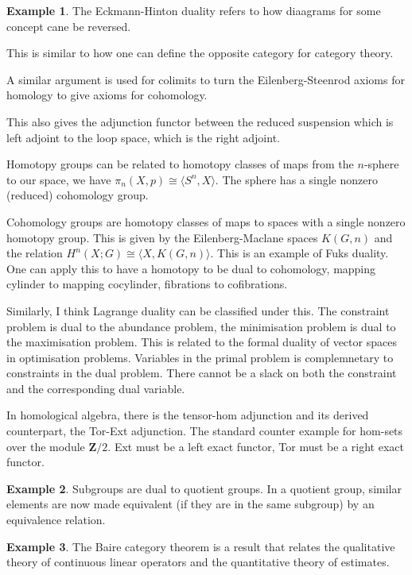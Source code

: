 \documentclass[10pt]{article}
\theoremstyle{plain}%
\theoremstyle{definition}
\newtheorem{example}{Example}[section]
\theoremstyle{remark}
\begin{document}
\begin{example}
	The Eckmann-Hinton duality refers to how diaagrams for some concept cane be reversed.

	This is similar to how one can define the opposite category for category theory.

	A similar argument is used for colimits to turn the Eilenberg-Steenrod axioms for homology to give axioms for cohomology.

	This also gives the adjunction functor between the reduced suspension which is left adjoint to the loop space, which is the right adjoint.

	Homotopy groups can be related to homotopy classes of maps from the $n$-sphere to our space, we have $\pi_n(X, p) \cong \langle S^n, X \rangle$. The sphere has a single nonzero (reduced) cohomology group.

	Cohomology groups are homotopy classes of maps to spaces with a single nonzero homotopy group. This is given by the Eilenberg-Maclane spaces $K(G, n)$ and the relation
	$H^n(X;G) \cong \langle X, K(G,n) \rangle$. This is an example of Fuks duality. One can apply this to have a homotopy to be dual to cohomology, mapping cylinder to mapping cocylinder, fibrations to cofibrations.

	Similarly, I think Lagrange duality can be classified under this. The constraint problem is dual to the abundance problem, the minimisation problem is dual to the maximisation problem. This is related to the formal duality of vector spaces in optimisation problems. Variables in the primal problem is complemnetary to constraints in the dual problem. There cannot be a slack on both the constraint and the corresponding dual variable.

	In homological algebra, there is the tensor-hom adjunction and its derived counterpart, the Tor-Ext adjunction. The standard counter example for hom-sets over the module $\mathbf{Z}/2$.
	Ext must be a left exact functor, Tor must be a right exact functor.
\end{example}

\begin{example}
	Subgroups are dual to quotient groups. In a quotient group, similar elements are now made equivalent (if they are in the same subgroup) by an equivalence relation.
\end{example}

\begin{example}
	The Baire category theorem is a result that relates the qualitative theory of continuous linear operators and the quantitative theory of estimates.
\end{example}
\end{document}

